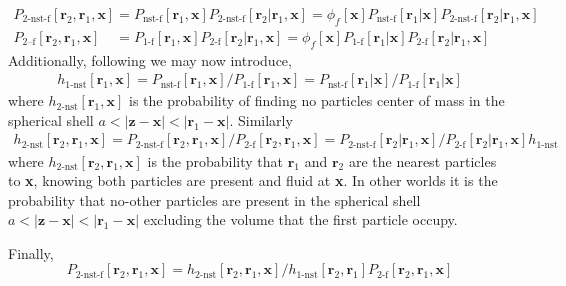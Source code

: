 \begin{align}
    P_\text{2-nst-f}[\textbf{r}_2,\textbf{r}_1,\textbf{x}]
    &= 
    P_\text{nst-f}[\textbf{r}_1,\textbf{x}]
    P_\text{2-nst-f}[\textbf{r}_2|\textbf{r}_1,\textbf{x}]
    = 
    \phi_f[\textbf{x}]
    P_\text{nst-f}[\textbf{r}_1|\textbf{x}]
    P_\text{2-nst-f}[\textbf{r}_2|\textbf{r}_1,\textbf{x}]\\
    P_\text{2--f}[\textbf{r}_2,\textbf{r}_1,\textbf{x}]
    &= 
    P_\text{1-f}[\textbf{r}_1,\textbf{x}]
    P_\text{2-f}[\textbf{r}_2|\textbf{r}_1,\textbf{x}]
    = 
    \phi_f[\textbf{x}]
    P_\text{1-f}[\textbf{r}_1|\textbf{x}]
    P_\text{2-f}[\textbf{r}_2|\textbf{r}_1,\textbf{x}]
\end{align}
Additionally, following \citet{zhang2021ensemble} we may now introduce, 
\begin{align}
    h_\text{1-nst}[\textbf{r}_1, \textbf{x}]
    =
    P_\text{nst-f}[\textbf{r}_1 , \textbf{x}] / P_\text{1-f}[\textbf{r}_1 ,\textbf{x}]
    = 
    P_\text{nst-f}[\textbf{r}_1 | \textbf{x}] /P_\text{1-f}[\textbf{r}_1 |\textbf{x}]
\end{align}
where $h_\text{2-nst}[\textbf{r}_1, \textbf{x}]$ is the probability of finding no particles center of mass in the spherical shell $a < |\textbf{z} - \textbf{x}| < |\textbf{r}_1 - \textbf{x}|$. 
Similarly
\begin{align}
    h_\text{2-nst}[\textbf{r}_2,\textbf{r}_1, \textbf{x}]
    =
    P_\text{2-nst-f}[\textbf{r}_2 ,\textbf{r}_1 , \textbf{x}] / P_\text{2-f}[\textbf{r}_2 ,\textbf{r}_1 ,\textbf{x}]
    =
    P_\text{2-nst-f}[\textbf{r}_2 |\textbf{r}_1 , \textbf{x}] 
    / 
    P_\text{2-f}[\textbf{r}_2 |\textbf{r}_1 ,\textbf{x}]
    h_\text{1-nst}
\end{align}
where $h_\text{2-nst}[\textbf{r}_2,\textbf{r}_1, \textbf{x}]$ is the probability that $\textbf{r}_1$ and $\textbf{r}_2$ are the nearest particles to \textbf{x}, knowing both particles are present and fluid at \textbf{x}. 
In other worlds it is the probability that no-other particles are present in the spherical shell $a < |\textbf{z} - \textbf{x}| < |\textbf{r}_1 - \textbf{x}|$ excluding the volume that the first particle occupy. 

Finally, 
\begin{equation}
    P_\text{2-nst-f}[\textbf{r}_2 ,\textbf{r}_1 , \textbf{x}] 
    =
    h_\text{2-nst}[\textbf{r}_2,\textbf{r}_1, \textbf{x}] 
    / h_\text{1-nst}[\textbf{r}_2,\textbf{r}_1 ]
    P_\text{2-f}[\textbf{r}_2 ,\textbf{r}_1 ,\textbf{x}]
\end{equation}

